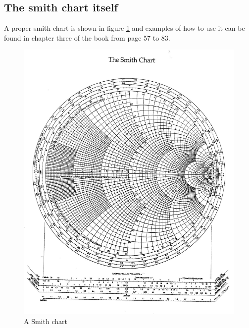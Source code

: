\documentclass[../transmission.tex]{subfiles}
\begin{document}
		\newpage
		\subsection{The smith chart itself}
			A proper smith chart is shown in figure \ref{fig:chap03_smith_chart} and examples of how to use it can be found in chapter three of the book from page 57 to 83. 
			\begin{figure}[h]
				\centering
				\includegraphics[width=0.87\linewidth]{../assets/chap03_smith_chart.jpg}
				\caption{A Smith chart}
				\label{fig:chap03_smith_chart}
			\end{figure}
\end{document}
